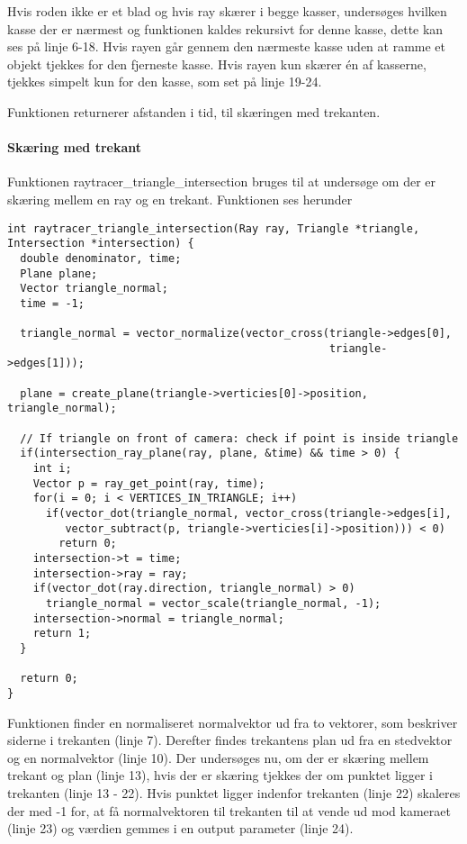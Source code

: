 Hvis roden ikke er et blad og hvis ray skærer i begge kasser, undersøges hvilken kasse der er nærmest og funktionen kaldes rekursivt for denne kasse, dette kan ses på linje 6-18. Hvis rayen går gennem den nærmeste kasse uden at ramme et objekt tjekkes for den fjerneste kasse. Hvis rayen kun skærer én af kasserne, tjekkes simpelt kun for den kasse, som set på linje 19-24.

Funktionen returnerer afstanden i tid, til skæringen med trekanten.

\paragraph{Skæring med trekant}

Funktionen raytracer\_triangle\_intersection bruges til at undersøge om der er skæring mellem en ray og en trekant. Funktionen ses herunder

\begin{lstlisting}[style=Cstyle, caption=Funktionen der finder skæring med trekant]
int raytracer_triangle_intersection(Ray ray, Triangle *triangle, Intersection *intersection) {
  double denominator, time;
  Plane plane;
  Vector triangle_normal;
  time = -1;

  triangle_normal = vector_normalize(vector_cross(triangle->edges[0], 
                                                  triangle->edges[1]));

  plane = create_plane(triangle->verticies[0]->position, triangle_normal);

  // If triangle on front of camera: check if point is inside triangle
  if(intersection_ray_plane(ray, plane, &time) && time > 0) {
    int i;
    Vector p = ray_get_point(ray, time);
    for(i = 0; i < VERTICES_IN_TRIANGLE; i++)
      if(vector_dot(triangle_normal, vector_cross(triangle->edges[i], 
         vector_subtract(p, triangle->verticies[i]->position))) < 0)
        return 0;
    intersection->t = time;
    intersection->ray = ray;
    if(vector_dot(ray.direction, triangle_normal) > 0)
      triangle_normal = vector_scale(triangle_normal, -1);
    intersection->normal = triangle_normal;
    return 1;
  }

  return 0;
}
\end{lstlisting}

Funktionen finder en normaliseret normalvektor ud fra to vektorer, som beskriver siderne i trekanten (linje 7). Derefter findes trekantens plan ud fra en stedvektor og en normalvektor (linje 10). Der undersøges nu, om der er skæring mellem trekant og plan (linje 13), hvis der er skæring tjekkes der om punktet ligger i trekanten (linje 13 - 22). Hvis punktet ligger indenfor trekanten (linje 22) skaleres der med -1 for, at få normalvektoren til trekanten til at vende ud mod kameraet (linje 23) og værdien gemmes i en output parameter (linje 24).

